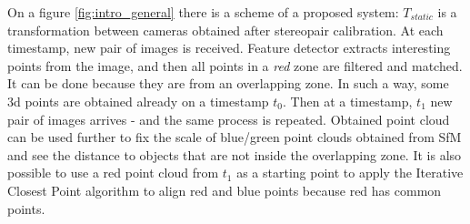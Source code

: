 On a figure \autoref{fig:intro_general} there is a scheme of a proposed system: $T_{static}$ is a transformation between cameras obtained after stereopair calibration. 
At each timestamp, new pair of images is received.
Feature detector extracts interesting points from the image, and then all points in a \textit{red} zone are filtered and matched.
It can be done because they are from an overlapping zone. 
In such a way, some 3d points are obtained already on a timestamp $t_0$. 
Then at a timestamp, $t_1$ new pair of images arrives - and the same process is repeated. 
Obtained point cloud can be used further to fix the scale of blue/green point clouds obtained from SfM and see the distance to objects that are not inside the overlapping zone.
It is also possible to use a red point cloud from $t_1$ as a starting point to apply the Iterative Closest Point algorithm to align red and blue points because red has common points.